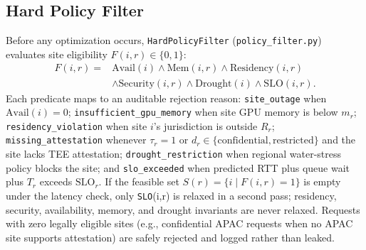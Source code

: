 \documentclass[conference]{IEEEtran}
\begin{document}
\subsection{Hard Policy Filter}
Before any optimization occurs, \texttt{HardPolicyFilter} (\texttt{policy\_filter.py}) evaluates site eligibility $F(i,r) \in \{0,1\}$:
\begin{equation}
\begin{split}
F(i,r) = {} & \mathrm{Avail}(i) \wedge \mathrm{Mem}(i,r) \wedge \mathrm{Residency}(i,r) \\
& \wedge \mathrm{Security}(i,r) \wedge \mathrm{Drought}(i) \wedge \mathrm{SLO}(i,r).
\end{split}
\end{equation}
Each predicate maps to an auditable rejection reason: \texttt{site\_outage} when $\mathrm{Avail}(i)=0$; \texttt{insufficient\_gpu\_memory} when site GPU memory is below $m_r$; \texttt{residency\_violation} when site $i$'s jurisdiction is outside $R_r$; \texttt{missing\_attestation} whenever $\tau_r=1$ or $d_r \in \{\text{confidential}, \text{restricted}\}$ and the site lacks TEE attestation; \texttt{drought\_restriction} when regional water-stress policy blocks the site; and \texttt{slo\_exceeded} when predicted RTT plus queue wait plus $T_r$ exceeds $\mathrm{SLO}_r$. If the feasible set $S(r)=\{i \mid F(i,r)=1\}$ is empty under the latency check, only \texttt{SLO}(i,r) is relaxed in a second pass; residency, security, availability, memory, and drought invariants are never relaxed. Requests with zero legally eligible sites (e.g., confidential APAC requests when no APAC site supports attestation) are safely rejected and logged rather than leaked.
\end{document}

